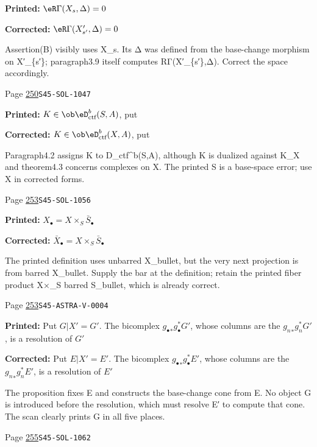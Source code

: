 \begin{description}
\par\noindent\textbf{Printed:} $\eR\Gamma(X_s,\Delta)=0$
\par\noindent\textbf{Corrected:} $\eR\Gamma(X_{s'}',\Delta)=0$
\par\noindent Assertion(B) visibly uses X\_s. Its Δ was defined from the base-change morphism on X′\_\{s′\}; paragraph3.9 itself computes RΓ(X′\_\{s′\},Δ). Correct the space accordingly.
\smallskip
\item[\hypertarget{apparatus:EN-0177}{177}] Page \hyperlink{printpage:en:250}{250}\quad\texttt{S45-SOL-1047}
\par\noindent\textbf{Printed:} $K\in\ob\eD_\text{ctf}^b(S,A)$, put
\par\noindent\textbf{Corrected:} $K\in\ob\eD_\text{ctf}^b(X,A)$, put
\par\noindent Paragraph4.2 assigns K to D\_ctf\textasciicircum{}b(S,A), although K is dualized against K\_X and theorem4.3 concerns complexes on X. The printed S is a base-space error; use X in corrected forms.
\smallskip
\item[\hypertarget{apparatus:EN-0178}{178}] Page \hyperlink{printpage:en:253}{253}\quad\texttt{S45-SOL-1056}
\par\noindent\textbf{Printed:} \(X_\bullet=X\times_S \bar S_\bullet\)
\par\noindent\textbf{Corrected:} \(\bar X_\bullet=X\times_S \bar S_\bullet\)
\par\noindent The printed definition uses unbarred X\_bullet, but the very next projection is from barred X\_bullet. Supply the bar at the definition; retain the printed fiber product X×\_S barred S\_bullet, which is already correct.
\smallskip
\item[\hypertarget{apparatus:EN-0179}{179}] Page \hyperlink{printpage:en:253}{253}\quad\texttt{S45-ASTRA-V-0004}
\par\noindent\textbf{Printed:} Put
$G|X'=G'$. The bicomplex ${g_\bullet}_\ast g_\bullet^\ast G'$, whose columns
are the ${g_n}_\ast g_n^\ast G'$, is a resolution of $G'$
\par\noindent\textbf{Corrected:} Put
$E|X'=E'$. The bicomplex ${g_\bullet}_\ast g_\bullet^\ast E'$, whose columns
are the ${g_n}_\ast g_n^\ast E'$, is a resolution of $E'$
\par\noindent The proposition fixes E and constructs the base-change cone from E. No object G is introduced before the resolution, which must resolve E′ to compute that cone. The scan clearly prints G in all five places.
\smallskip
\item[\hypertarget{apparatus:EN-0180}{180}] Page \hyperlink{printpage:en:255}{255}\quad\texttt{S45-SOL-1062}

\end{description}
